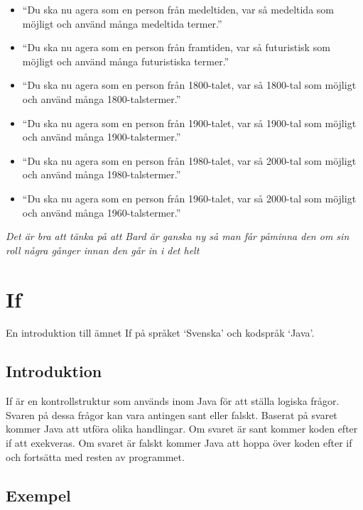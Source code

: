 \begin{itemize}
\tightlist
\item
  ``Du ska nu agera som en person från medeltiden, var så medeltida som
  möjligt och använd många medeltida termer.''
\item
  ``Du ska nu agera som en person från framtiden, var så futuristisk som
  möjligt och använd många futuristiska termer.''
\item
  ``Du ska nu agera som en person från 1800-talet, var så 1800-tal som
  möjligt och använd många 1800-talstermer.''
\item
  ``Du ska nu agera som en person från 1900-talet, var så 1900-tal som
  möjligt och använd många 1900-talstermer.''
\item
  ``Du ska nu agera som en person från 1980-talet, var så 2000-tal som
  möjligt och använd många 1980-talstermer.''
\item
  ``Du ska nu agera som en person från 1960-talet, var så 2000-tal som
  möjligt och använd många 1960-talstermer.''
\end{itemize}

\emph{Det är bra att tänka på att Bard är ganska ny så man får påminna
den om sin roll några gånger innan den går in i det helt}

\hypertarget{if}{%
\section{If}\label{if}}

En introduktion till ämnet If på språket `Svenska' och kodspråk `Java'.

\hypertarget{introduktion}{%
\subsection{Introduktion}\label{introduktion}}

If är en kontrollstruktur som används inom Java för att ställa logiska
frågor. Svaren på dessa frågor kan vara antingen sant eller falskt.
Baserat på svaret kommer Java att utföra olika handlingar. Om svaret är
sant kommer koden efter if att exekveras. Om svaret är falskt kommer
Java att hoppa över koden efter if och fortsätta med resten av
programmet.

\hypertarget{exempel}{%
\subsection{Exempel}\label{exempel}}

